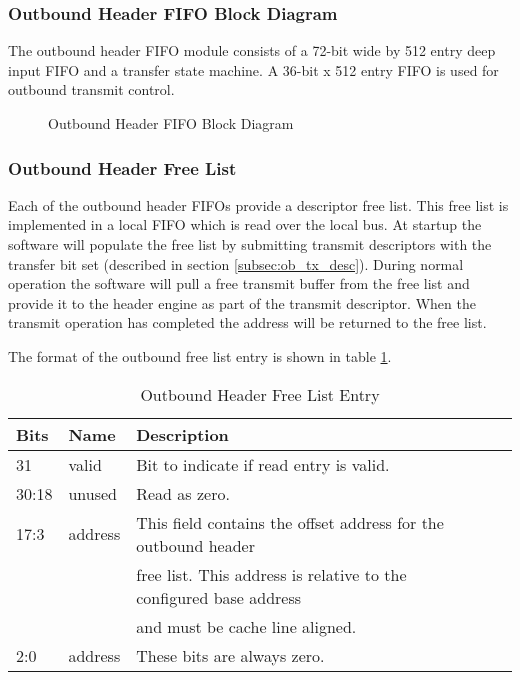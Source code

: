\documentclass[11pt]{article}
\begin{document}
\subsubsection{Outbound Header FIFO Block Diagram}

The outbound header FIFO module consists of a 72-bit wide by 512 entry deep input FIFO and a transfer state machine. A 36-bit x 512 entry FIFO is used
for outbound transmit control.

\begin{figure}[H]
   \centering
   \caption{Outbound Header FIFO Block Diagram}
   \label{fig:ob_head_block}
\end{figure}

\subsubsection{Outbound Header Free List}

Each of the outbound header FIFOs provide a descriptor free list.  This free list is implemented in a local FIFO which is read over the local bus. 
At startup the software will populate the free list by submitting transmit descriptors with the transfer bit set (described in section \ref{subsec:ob_tx_desc}). 
During normal operation the software will pull a free transmit buffer from the free list and provide it to the header engine as part of the transmit descriptor. 
When the transmit operation has completed the address will be returned to the free list. 

The format of the outbound free list entry is shown in table \ref{tab:ob_tx_flist}.

\begin{table}[H]
\small
\centering
   \begin{tabular}{| l | l | l | l | l | } 
      \hline \textbf{Bits} & \textbf{Name} & \textbf{Description} \\
      \hline 31            & valid         & Bit to indicate if read entry is valid. \\
      \hline 30:18         & unused        & Read as zero.                                                        \\
      \hline 17:3          & address       & This field contains the offset address for the outbound header    \\
                           &               & free list. This address is relative to the configured base address \\
                           &               & and must be cache line aligned.                                    \\
      \hline 2:0           & address       & These bits are always zero.                                                \\
      \hline
   \end{tabular}
   \caption{Outbound Header Free List Entry}
   \label{tab:ob_tx_flist}
\end{table}
\end{document}

